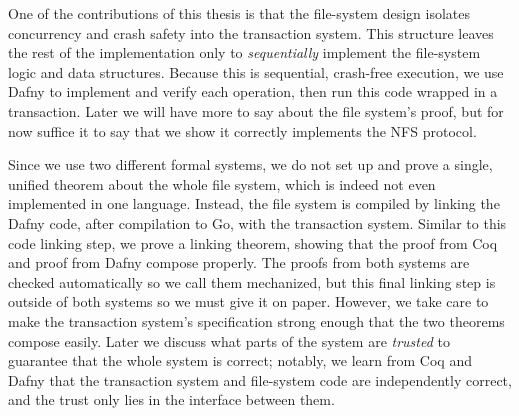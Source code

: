One of the contributions of this thesis is that the file-system design isolates
concurrency and crash safety into the transaction system. This structure leaves
the rest of the implementation only to \emph{sequentially} implement the
file-system logic and data structures. Because this is sequential, crash-free
execution, we use Dafny to implement and verify each operation, then run this
code wrapped in a transaction. Later we will have more to say about the file
system's proof, but for now suffice it to say that we show it correctly
implements the NFS protocol.

Since we use two different formal systems, we do not set up and prove a single,
unified theorem about the whole file system, which is indeed not even
implemented in one language. Instead, the file system is compiled by linking the
Dafny code, after compilation to Go, with the transaction system. Similar to
this code linking step, we prove a linking theorem, showing that the proof from
Coq and proof from Dafny compose properly. The proofs from both systems are
checked automatically so we call them mechanized, but this final linking step is
outside of both systems so we must give it on paper. However, we take care to
make the transaction system's specification strong enough that the two theorems
compose easily. Later we discuss what parts of the system are \emph{trusted} to
guarantee that the whole system is correct; notably, we learn from Coq and Dafny
that the transaction system and file-system code are independently correct, and
the trust only lies in the interface between them.
